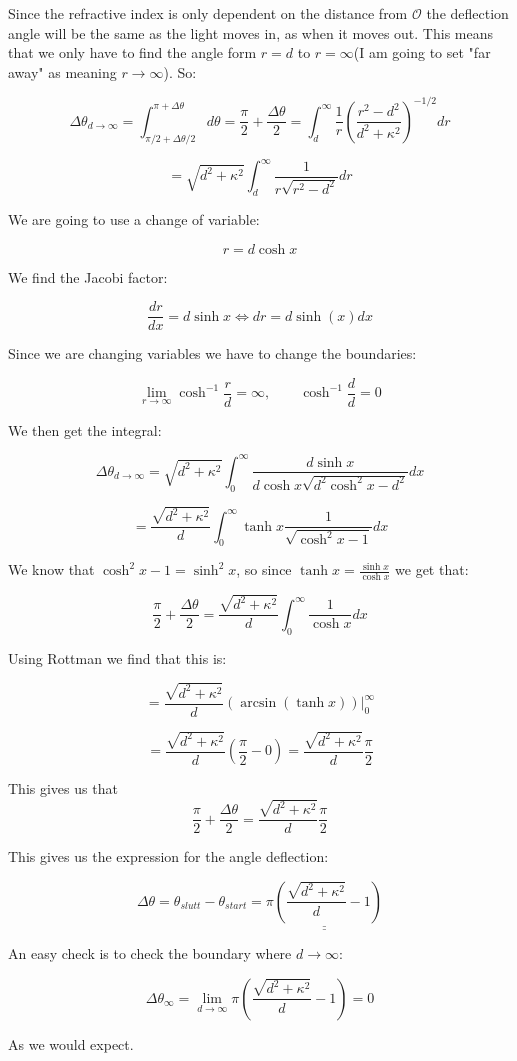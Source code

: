 \documentclass[a4paper,norsk, 10pt]{article}
\begin{document}
Since the refractive index is only dependent on the distance from $\mathcal{O}$ the deflection angle will be the same as the light moves in, as when it moves out. This means that we only have to find the angle form $r = d$ to $r = \infty$(I am going to set "far away" as meaning $r\rightarrow \infty$). So:

$$
\Delta\theta_{d\rightarrow \infty}=\int_{\pi/2 +\Delta\theta/2}^{\pi + \Delta\theta} d\theta = \frac{\pi}{2} + \frac{\Delta \theta}{2} = \int_d^{\infty} \frac{1}{r}\left(\frac{r^2 -d^2}{d^2 +\kappa^2}\right)^{-1/2}dr
$$

$$
= \sqrt{d^2 +\kappa^2}\int_d^{\infty} \frac{1}{r\sqrt{r^2 - d^2}}dr
$$

We are going to use a change of variable:

$$
r = d \cosh x
$$

We find the Jacobi factor:

$$
\frac{dr}{dx} = d\sinh x \Leftrightarrow dr = d\sinh(x) dx
$$

Since we are changing variables we have to change the boundaries:

$$
\lim_{r\rightarrow \infty}\cosh^{-1} \frac{r}{d} = \infty, \qquad \cosh^{-1}\frac{d}{d} = 0
$$

We then get the integral:

$$
\Delta\theta_{d\rightarrow \infty} = \sqrt{d^2 +\kappa^2}\int_0^{\infty} \frac{d\sinh x}{d\cosh x\sqrt{d^2\cosh^2 x - d^2}}dx
$$

$$
= \frac{\sqrt{d^2 +\kappa^2}}{d}\int_0^{\infty} \tanh x \frac{1}{\sqrt{\cosh^2 x - 1}}dx
$$

We know that $\cosh^2 x - 1 = \sinh^2 x$, so since $\tanh x = \frac{\sinh x}{\cosh x}$ we get that:

$$
\frac{\pi}{2} + \frac{\Delta \theta}{2} = \frac{\sqrt{d^2 +\kappa^2}}{d}\int_0^{\infty} \frac{1}{\cosh x}dx
$$

Using Rottman we find that this is:

$$
= \frac{\sqrt{d^2 +\kappa^2}}{d} (\arcsin(\tanh x)) \bigg|_0^{\infty}
$$

$$
= \frac{\sqrt{d^2 +\kappa^2}}{d} \left(\frac{\pi}{2} - 0\right) = \frac{\sqrt{d^2 +\kappa^2}}{d} \frac{\pi}{2}
$$

This gives us that 
$$
\frac{\pi}{2} + \frac{\Delta \theta}{2} = \frac{\sqrt{d^2 +\kappa^2}}{d} \frac{\pi}{2}
$$


This gives us the expression for the angle deflection:

$$
\Delta \theta = \theta_{slutt} - \theta_{start} = \underline{\underline{\pi \left(\frac{\sqrt{d^2 +\kappa^2}}{d} - 1\right)}}
$$

An easy check is to check the boundary where $d \rightarrow \infty$:

$$
\Delta \theta_{\infty} = \lim_{d\rightarrow \infty}  \pi \left(\frac{\sqrt{d^2 +\kappa^2}}{d} - 1\right) = 0
$$

As we would expect.
\end{document}
